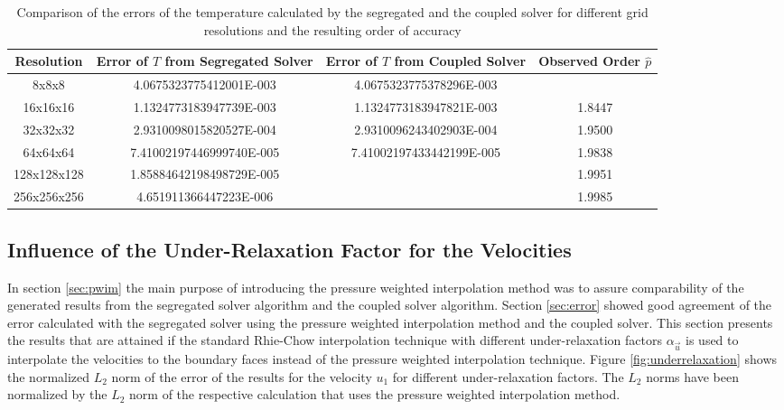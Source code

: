 \begin{table}[h!]\centering
{}
  \begin{tabular}{cccc}\toprule
    Resolution & Error of \(T\) from Segregated Solver & Error of \(T\) from Coupled Solver & Observed Order \(\hat{p}\) \\
    \midrule
    \rowcolor{black!20} 8x8x8       & 4.0675323775412001E-003  & 4.0675323775378296E-003  &        \\%
    \rowcolor{black!00} 16x16x16    & 1.1324773183947739E-003  & 1.1324773183947821E-003  & 1.8447 \\%
    \rowcolor{black!20} 32x32x32    & 2.9310098015820527E-004  & 2.9310096243402903E-004  & 1.9500 \\%
    \rowcolor{black!00} 64x64x64    & 7.41002197446999740E-005 & 7.41002197433442199E-005 & 1.9838 \\%
    \rowcolor{black!20} 128x128x128 & 1.85884642198498729E-005 &                          & 1.9951 \\%
    \rowcolor{black!00} 256x256x256 & 4.651911366447223E-006   &                          & 1.9985 \\%
  \end{tabular}
  \caption{Comparison of the errors of the temperature calculated by the segregated and the coupled solver for different grid resolutions and the resulting order of accuracy}
  \label{tab:temporder}
\end{table}

\subsection{Influence of the Under-Relaxation Factor for the Velocities}
\label{sec:independence}

In section \ref{sec:pwim} the main purpose of introducing the pressure weighted interpolation method was to assure comparability of the generated results from the segregated solver algorithm and the coupled solver algorithm. Section \ref{sec:error} showed good agreement of the error calculated with the segregated solver using the pressure weighted interpolation method and the coupled solver. This section presents the results that are attained if the standard Rhie-Chow interpolation technique with different under-relaxation factors \(\alpha_\vec{u}\) is used to interpolate the velocities to the boundary faces instead of the pressure weighted interpolation technique. Figure \ref{fig:underrelaxation} shows the normalized \(L_2\) norm of the error of the results for the velocity \(u_1\) for different under-relaxation factors. The \(L_2\) norms have been normalized by the \(L_2\) norm of the respective calculation that uses the pressure weighted interpolation method. 

